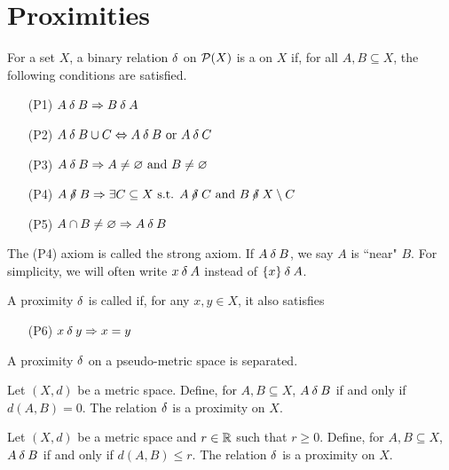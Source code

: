 \section{Proximities}
\label{proximities}
	
\begin{definition}
	For a set \( X \), a binary relation \( \mathord{\delta} \) on \( \mathcal{P}(X) \) is a  on \( X \) if, for all \( A,B \subseteq X \), the following conditions are satisfied.
	\begin{enumerate}
		\item[(P1)]
			\( A \mathbin{\delta} B \Rightarrow B \mathbin{\delta} A \)
		\item[(P2)]
			\( A \mathbin{\delta} B \cup C \Leftrightarrow A \mathbin{\delta} B \text{ or } A \mathbin{\delta} C \)
		\item[(P3)]
			\( A \mathbin{\delta} B \Rightarrow A \neq \varnothing \text{ and } B \neq \varnothing \)
		\item[(P4)]
			\( A \nnear B \implies \exists C \subseteq X \textst A \nnear C \textand B \nnear X \setminus C \)
		\item[(P5)]
			\( A \cap B \neq \varnothing \Rightarrow A \mathbin{\delta} B \)
	\end{enumerate}
\end{definition}
	
	The (P4) axiom is called the strong axiom.  If \( A \mathbin{\delta} B \), we say \( A \) is ``near" \( B \). 	For simplicity, we will often write \( x \mathbin{\delta} A \) instead of \( \{x\} \mathbin{\delta} A \).
	
\begin{definition}
	A proximity \( \mathord{\delta} \) is called  if, for any \( x,y \in X \), it also satisfies
	\begin{enumerate}
		\item[(P6)]
			\( x \mathbin{\delta} y \Rightarrow x = y \)
	\end{enumerate}
\end{definition}

\begin{remark}
	A proximity \( \mathord{\delta} \) on a pseudo-metric space is separated.
\end{remark}

\begin{example}
	Let \( (X,d) \) be a metric space.  Define, for \( A,B \subseteq X \), \( A \mathbin{\delta} B \) if and only if \( d(A,B) = 0 \).  The relation \( \mathord{\delta} \) is a proximity on \( X \).
\end{example}

\begin{example}
	Let \( (X,d) \) be a metric space and \( r \in \mathbb{R} \) such that \( r \geq 0 \).  Define, for \( A,B \subseteq X \), \( A \mathbin{\delta} B \) if and only if \( d(A,B) \leq r \).  The relation \( \mathord{\delta} \) is a proximity on \( X \).
\end{example}

